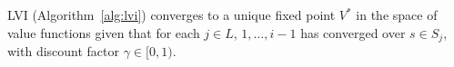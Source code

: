 \begin{proposition}
    \label{prop:lvi}
    LVI (Algorithm~\ref{alg:lvi}) converges to a unique fixed point $V^*$ in the space of value functions given that for each $j \in L$, $1, \ldots, i - 1$ has converged over $s \in S_j$, with discount factor $\gamma \in [0, 1)$.
\end{proposition}







